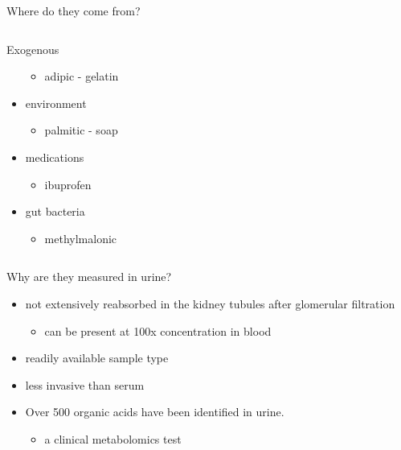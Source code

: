 \documentclass[presentation, smaller]{beamer}
\begin{document}
\begin{frame}[label={sec:orgheadline6}]{Where do they come from?}
\begin{columns}
\begin{column}{0.5\columnwidth}
\begin{block}{Exogenous}
\begin{itemize}
\begin{itemize}
\item adipic - gelatin
\end{itemize}
\item environment
\begin{itemize}
\item palmitic - soap
\end{itemize}
\item medications
\begin{itemize}
\item ibuprofen
\end{itemize}
\item gut bacteria
\begin{itemize}
\item methylmalonic
\end{itemize}
\end{itemize}
\end{block}
\end{column}
\end{columns}
\end{frame}

\begin{frame}[label={sec:orgheadline7}]{Why are they measured in urine?}
\begin{itemize}
\item not extensively reabsorbed in the kidney tubules after glomerular
filtration
\begin{itemize}
\item can be present at 100x concentration in blood
\end{itemize}
\item readily available sample type
\item less invasive than serum
\item Over 500 organic acids have been identified in urine.
\begin{itemize}
\item a clinical metabolomics test
\end{itemize}
\end{itemize}
\end{frame}
\end{document}
